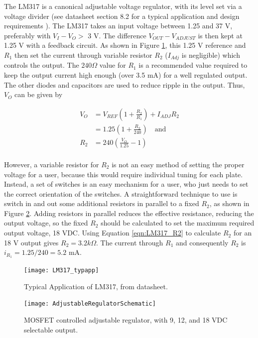 \documentclass{article}
\begin{document}
		The LM317 is a canonical adjustable voltage regulator, with its level set via a voltage divider (see datasheet section 8.2 for a typical application and design requirements \cite{LM317datasheet}).  The LM317 takes an input voltage between 1.25 and 37 V, preferably with $V_I - V_O > $ 3 V.  The difference $V_{OUT} - V_{ADJUST}$ is then kept at 1.25 V with a feedback circuit.  As shown in Figure \ref{fig:LM317_typicalapp}, this 1.25 V reference and $R_1$ then set the current through variable resistor $R_2$ ($I_{Adj}$ is negligible) which controls the output.  The $240 \Omega$ value for $R_1$ is a recommended value required to keep the output current high enough (over 3.5 mA) for a well regulated output.  The other diodes and capacitors are used to reduce ripple in the output.  Thus, $V_O$ can be given by

		\begin{align}
			V_O &= V_{REF}(1 + \frac{R_2}{R_1}) + I_{ADJ}R_2 \\
			&= 1.25 (1 + \frac{R_2}{240}) \quad \text{and} \\
			R_2 &= 240 \left( \frac{V_O}{1.25} - 1 \right) \\
			\label{eqn:LM317_R2}
		\end{align}

		However, a variable resistor for $R_2$ is not an easy method of setting the proper voltage for a user, because this would require individual tuning for each plate.  Instead, a set of switches is an easy mechanism for a user, who just needs to set the correct orientation of the switches.  A straightforward technique to use is switch in and out some additional resistors in parallel to a fixed $R_2$, as shown in Figure \ref{fig:adjustableregulatorschematic}.  Adding resistors in parallel reduces the effective resistance, reducing the output voltage, so the fixed $R_2$ should be calculated to set the maximum required output voltage, 18 VDC.  Using Equation \ref{eqn:LM317_R2} to calculate $R_2$ for an 18 V output gives $R_2 = 3.2 k\Omega$. The current through $R_1$ and consequently $R_2$ is $i_{R_1} = 1.25/240 = 5.2$ mA.  

		\begin{figure}
			\centering
			\texttt{[image: LM317\_typapp]}
			\caption{Typical Application of LM317, from datasheet.}
			\label{fig:LM317_typicalapp}
		\end{figure}

		\begin{figure}
			\centering
			\texttt{[image: AdjustableRegulatorSchematic]}
			\caption{MOSFET controlled adjustable regulator, with 9, 12, and 18 VDC selectable output.}
			\label{fig:adjustableregulatorschematic}
		\end{figure}
\end{document}
